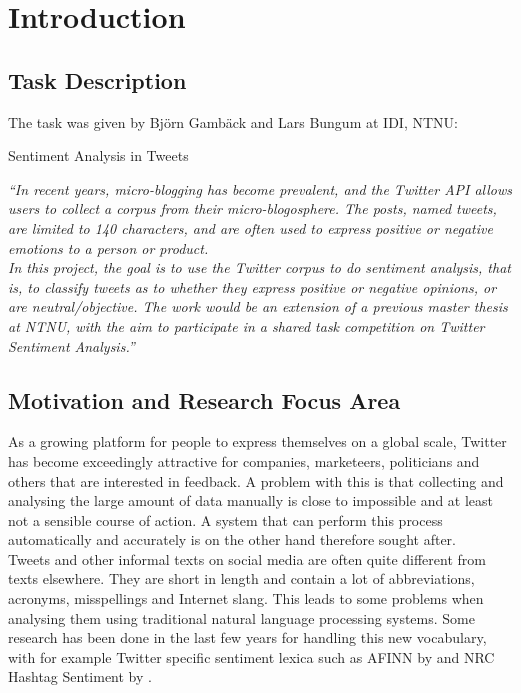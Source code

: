 \chapter{Introduction}
\label{cha:introduction}

\section{Task Description}
\label{sec:field}

The task was given by Björn Gambäck and Lars Bungum at IDI, NTNU:
\begin{center}{\large Sentiment Analysis in Tweets }\\\end{center}

\textit{``In recent years, micro-blogging has become prevalent, and the Twitter API allows users to collect a corpus from their micro-blogosphere. The posts, named tweets, are limited to 140 characters, and are often used to express positive or negative emotions to a person or product. } \\

\textit{In this project, the goal is to use the Twitter corpus to do sentiment analysis, that is, to classify tweets as to whether they express positive or negative opinions, or are neutral/objective. The work would be an extension of a previous master thesis at NTNU, with the aim to participate in a shared task competition on Twitter Sentiment Analysis.''} \\

\section{Motivation and Research Focus Area}
\label{sec:motivation}
As a growing platform for people to express themselves on a global scale, Twitter has become exceedingly attractive for companies, marketeers, politicians and others that are interested in feedback. A problem with this is that collecting and analysing the large amount of data manually is close to impossible and at least not a sensible course of action. A system that can perform this process automatically and accurately is on the other hand therefore sought after.\\

Tweets and other informal texts on social media are often quite different from texts elsewhere. They are short in length and contain a lot of abbreviations, acronyms, misspellings and Internet slang. This leads to some problems when analysing them using traditional natural language processing systems. Some research has been done in the last few years for handling this new vocabulary, with for example Twitter specific sentiment lexica such as AFINN by \citet{AFINN} and NRC Hashtag Sentiment by \cite{MohammadKZ2013}.  \\

